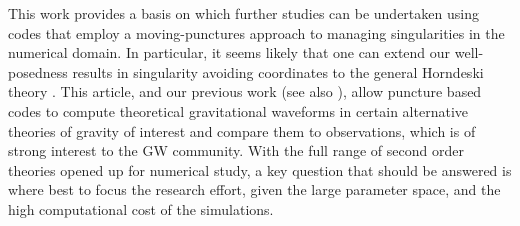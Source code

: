 \documentclass[reprint,aps,amsmath,amssymb,twoside,prd,showkeys,superscriptaddress,nofootinbib]{revtex4-2}
\begin{document}
This work provides a basis on which further studies can be undertaken using codes that employ a moving-punctures approach to managing singularities in the numerical domain. In particular, it seems likely that one can extend our well-posedness results in singularity avoiding coordinates to the general Horndeski theory \cite{Kovacs:2020pns,Kovacs:2020ywu}. 
This article, and our previous work \cite{short_paper} (see also \cite{Cayuso:2023aht}), allow puncture based codes to compute theoretical gravitational waveforms in certain alternative theories of gravity of interest and compare them to observations, which is of strong interest to the GW community.
With the full range of second order theories opened up for numerical study, a key question that should be answered is where best to focus the research effort, given the large parameter space, and the high computational cost of the simulations.
\end{document}
